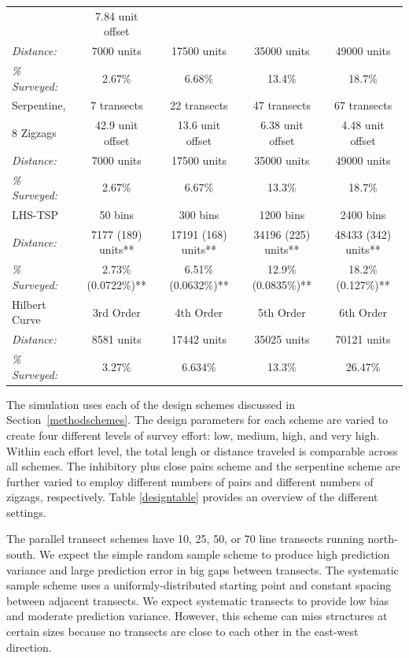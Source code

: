 \documentclass[review]{elsarticle}
\begin{document}
\begin{table}
\begin{tabular}{|l|c|c|c|c|}
&
7.84 unit offset
\\
\hfill\emph{Distance:}
&
7000 units
&
17500 units
&
35000 units
&
49000 units
\\
\hfill\emph{\% Surveyed:}
&
2.67\%
&
6.68\%
&
13.4\%
&
18.7\%
\\
\hline
Serpentine,
&
7 transects
&
22 transects
&
47 transects
&
67 transects
\\
8 Zigzags
&
42.9 unit offset
&
13.6 unit offset
&
6.38 unit offset
&
4.48 unit offset
\\
\hfill\emph{Distance:}
&
7000 units
&
17500 units
&
35000 units
&
49000 units
\\
\hfill\emph{\% Surveyed:}
&
2.67\%
&
6.67\%
&
13.3\%
&
18.7\%
\\
\hline
LHS-TSP
&
50 bins
&
300 bins
&
1200 bins
&
2400 bins
\\
\hfill\emph{Distance:}
&
7177 (189) units**
&
17191 (168) units**
&
34196 (225) units**
&
48433 (342) units**
\\
\hfill\emph{\% Surveyed:}
&
2.73\% (0.0722\%)**
&
6.51\% (0.0632\%)**
&
12.9\% (0.0835\%)**
&
18.2\% (0.127\%)**
\\
\hline
Hilbert Curve
&
3rd Order
&
4th Order
&
5th Order
&
6th Order
\\
\hfill\emph{Distance:}
&
8581 units
&
17442 units
&
35025 units
&
70121 units
\\
\hfill\emph{\% Surveyed:}
&
3.27\%
&
6.634\%
&
13.3\%
&
26.47\%
\\
\hline
\end{tabular}
\end{table}

The simulation uses each of the design schemes discussed in
Section~\ref{methodschemes}. The design parameters for each scheme are varied
to create four different levels of survey effort: low, medium, high, and very
high. Within each effort level, the total lengh or distance traveled is
comparable across all schemes. The inhibitory plus close pairs scheme and the
serpentine scheme are further varied to employ different numbers of pairs
and different numbers of zigzags, respectively. Table \ref{designtable}
provides an overview of the different settings.

The parallel transect schemes have 10, 25, 50, or 70 line transects running
north-south. We expect the simple random sample scheme to produce high
prediction variance and large prediction error in big gaps between transects.
The systematic sample scheme uses a uniformly-distributed starting point and
constant spacing between adjacent transects. We expect systematic transects to
provide low bias and moderate prediction variance. However, this scheme can
miss structures at certain sizes because no transects are close to each other
in the east-west direction.
\end{document}
